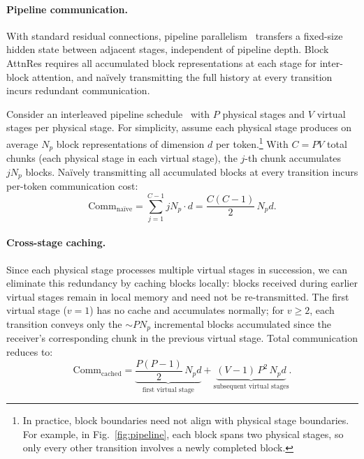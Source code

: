 \paragraph{Pipeline communication.}
With standard residual connections, pipeline parallelism~\citep{huang2019gpipe} transfers a fixed-size hidden state between adjacent stages, independent of pipeline depth.
Block AttnRes requires all accumulated block representations at each stage for inter-block attention, and na\"ively transmitting the full history at every transition incurs redundant communication.

Consider an interleaved pipeline schedule~\citep{narayanan2021megatron} with $P$ physical stages and $V$ virtual stages per physical stage.
For simplicity, assume each physical stage produces on average $N_p$ block representations of dimension $d$ per token.\footnote{In practice, block boundaries need not align with physical stage boundaries. For example, in Fig.~\ref{fig:pipeline}, each block spans two physical stages, so only every other transition involves a newly completed block.}
With $C = PV$ total chunks (each physical stage in each virtual stage), the $j$-th chunk accumulates $jN_p$ blocks.
Na\"ively transmitting all accumulated blocks at every transition incurs per-token communication cost:
\begin{equation}
    \mathrm{Comm}_{\text{na\"ive}} = \sum_{j=1}^{C-1} jN_p \cdot d = \frac{C(C{-}1)}{2}\,N_p d.
\end{equation}
\paragraph{Cross-stage caching.}
Since each physical stage processes multiple virtual stages in succession, we can eliminate this redundancy by caching blocks locally: blocks received during earlier virtual stages remain in local memory and need not be re-transmitted.
The first virtual stage ($v = 1$) has no cache and accumulates normally; for $v \geq 2$, each transition conveys only the ${\sim}P N_p$ incremental blocks accumulated since the receiver's corresponding chunk in the previous virtual stage.
Total communication reduces to:
\begin{equation}
    \mathrm{Comm}_{\text{cached}} = \underbrace{\frac{P(P{-}1)}{2}\, N_p d}_{\text{first virtual stage}} + \underbrace{(V{-}1)\, P^2\, N_p d}_{\text{subsequent virtual stages}}.
\end{equation}

